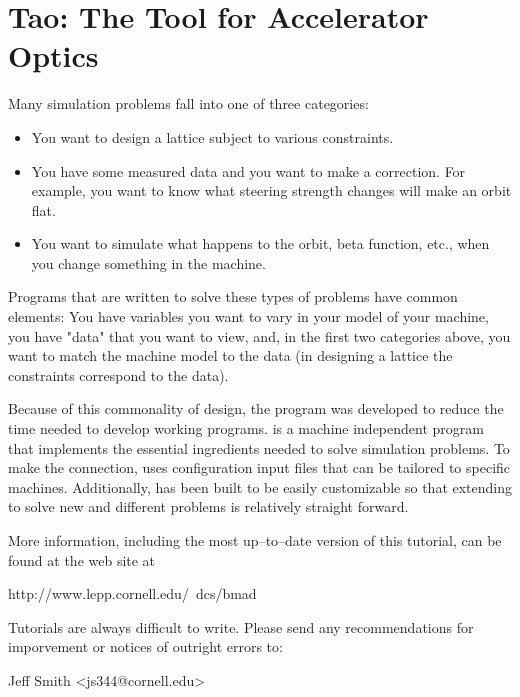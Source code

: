 \documentclass{book}
\begin{document}
{
\setlength{\parskip}{\dPar}
\setlength{\parindent}{0ex}

\section*{Tao: The Tool for Accelerator Optics}

Many simulation problems fall into one of three categories: 

\begin{itemize}
\item 
You want to design a lattice subject to various constraints.
\item 
You have some measured data and you want to make a correction. For
example, you want to know what steering strength changes will make an orbit
flat.
\item
You want to simulate what happens to the orbit, beta function,
etc., when you change something in the machine.
\end{itemize}

Programs that are written to solve these types of problems have common
elements: You have variables you want to vary in your model of your
machine, you have "data" that you want to view, and, in the first two
categories above, you want to match the machine model to the data (in
designing a lattice the constraints correspond to the data).

Because of this commonality of design, the \tao program was developed
to reduce the time needed to develop working programs. \tao is a
machine independent program that implements the essential ingredients
needed to solve simulation problems. To make the
connection, \tao uses configuration input files that can be tailored to
specific machines. Additionally, \tao has been built
to be easily customizable so that extending \tao to solve new and
different problems is relatively straight forward.

More information, including the most up--to--date version of this
tutorial, can be found at the \bmad web site at
\begin{example}
  http://www.lepp.cornell.edu/~dcs/bmad
\end{example}

Tutorials are always difficult to write. Please send any recommendations 
for imporvement or notices of outright errors to:
\begin{example}
  Jeff Smith <js344@cornell.edu>
\end{example}
}

\tableofcontents
\end{document}
